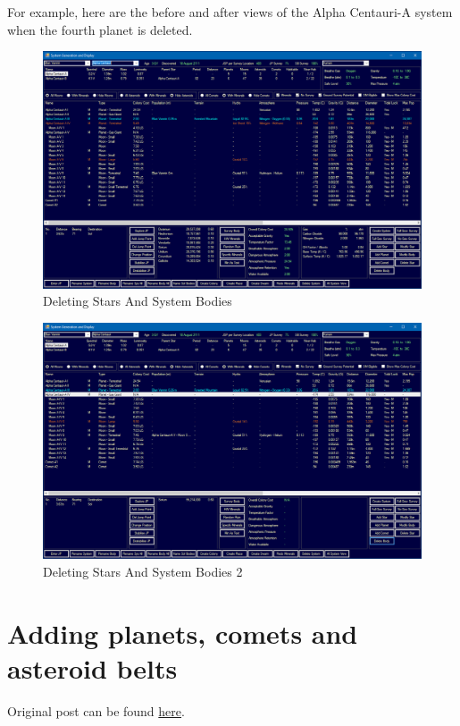 \documentclass[../Aurora C# unofficial manual.tex]{subfiles}
\begin{document}
	For example, here are the before and after views of the Alpha Centauri-A system when the fourth planet is deleted.
	\begin{figure}[H]
		\centering
		\includegraphics[width=0.95\linewidth]{images/DeletingStarsAndBodies}
		\caption[Deleting Stars And System Bodies]{Deleting Stars And System Bodies}
		\label{fig:deletingstarsandbodies}
	\end{figure}
	\begin{figure}[H]
		\centering
		\includegraphics[width=0.95\linewidth]{images/DeletingStarsAndBodies2}
		\caption[Deleting Stars And System Bodies]{Deleting Stars And System Bodies 2}
		\label{fig:deletingstarsandbodies2}
	\end{figure}
	
	\section{Adding planets, comets and asteroid belts}\label{5_adding_planets_comets_asteroid}
	Original post can be found
	\href{http://aurora2.pentarch.org/index.php?topic=8495.msg118767#msg118767}{here}.
	\newline\newline
	
\end{document}
